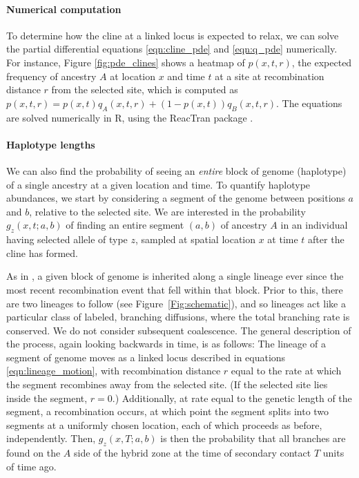 \documentclass[11pt,letterpaper]{article}
\begin{document}
\paragraph{Numerical computation}
To determine how the cline at a linked locus is expected to relax,
we can solve the partial differential equations \eqref{eqn:cline_pde} and \eqref{eqn:q_pde} numerically.
For instance, Figure \ref{fig:pde_clines} shows a heatmap of $p(x,t,r)$, 
the expected frequency of ancestry $A$ at location $x$ and time $t$ 
at a site at recombination distance $r$ from the selected site,
which is computed as $p(x,t,r) = p(x,t) q_A(x,t,r) + (1-p(x,t)) q_B(x,t,r)$. 
The equations are solved numerically in R, using the ReacTran package \citep{soetaert2012reactive}.

\paragraph{Haplotype lengths}
We can also find the probability of seeing an \emph{entire} block of genome (haplotype)
of a single ancestry at a given location and time.
To quantify haplotype abundances, we start by considering a segment of the genome between positions $a$ and $b$, relative to the selected site. 
We are interested in the probability $g_z(x,t;a,b)$ 
of finding an entire segment $(a,b)$ of ancestry $A$ in an individual having selected allele of type $z$,
sampled at spatial location $x$ at time $t$ after the cline has formed.

As in \citet{Sedghifar2015}, 
a given block of genome is inherited along a single lineage ever since the most recent recombination event
that fell within that block.
Prior to this, there are two lineages to follow (see Figure~\ref{Fig:schematic}),
and so lineages act like a particular class of labeled, branching diffusions,
where the total branching rate is conserved. 
We do not consider subsequent coalescence.
The general description of the process, again looking backwards in time, is as follows:
The lineage of a segment of genome moves as a linked locus described in equations \eqref{eqn:lineage_motion},
with recombination distance $r$ equal to the rate at which the segment recombines away from the selected site.
(If the selected site lies inside the segment, $r=0$.)
Additionally, at rate equal to the genetic length of the segment,
a recombination occurs, at which point the segment splits into two segments at a uniformly chosen location,
each of which proceeds as before, independently. 
Then, $g_z(x,T;a,b)$ is then the probability that all branches are found on the $A$ side of the hybrid zone
at the time of secondary contact $T$ units of time ago.
\end{document}
